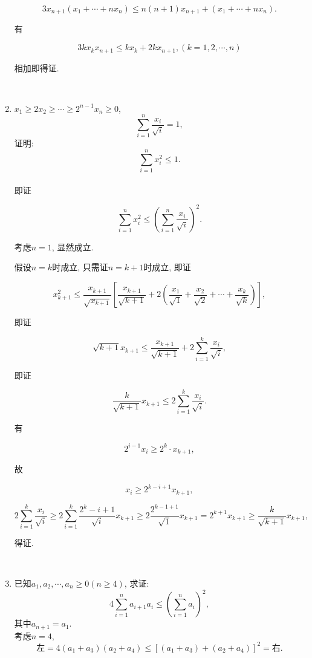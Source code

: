 \documentclass[8pt]{article}
\begin{document}
\begin{enumerate}
			$$3x_{n+1} (x_1 + \cdots + nx_n) \leq n(n+1) x_{n+1} + (x_1 + \cdots + nx_n).$$

			有

			$$3kx_k x_{n+1} \leq kx_k + 2kx_{n+1}, (k=1, 2, \cdots, n)$$

			相加即得证.

		~\\

		\item $x_1 \geq 2x_2 \geq \cdots \geq 2^{n-1} x_n \geq 0$, $$\sum_{i=1}^{n} \frac{x_i}{\sqrt{i}}=1,$$ 证明: $$\sum_{i=1}^{n} x_i^2 \leq 1.$$
			~\\

			即证

			$$\sum_{i=1}^{n} x_i^2 \leq \left(\sum_{i=1}^{n} \frac{x_i}{\sqrt{i}}\right)^2.$$

			考虑$n=1$, 显然成立.

			假设$n=k$时成立, 只需证$n=k+1$时成立, 即证

			$$x_{k+1}^2 \leq \frac{x_{k+1}}{\sqrt{x_{k+1}}} \left[\frac{x_{k+1}}{\sqrt{k+1}} + 2\left(\frac{x_1}{\sqrt{1}} + \frac{x_2}{\sqrt{2}} + \cdots + \frac{x_k}{\sqrt{k}}\right)\right],$$
 
			即证

			$$\sqrt{k+1} x_{k+1} \leq \frac{x_{k+1}}{\sqrt{k+1}} + 2\sum_{i=1}^{k} \frac{x_i}{\sqrt{i}},$$

			即证

			$$\frac{k}{\sqrt{k+1}} x_{k+1} \leq 2\sum_{i=1}^{k} \frac{x_i}{\sqrt{i}}.$$

			有

			$$2^{i-1} x_i \geq 2^k \cdot x_{k+1},$$

			故

			$$x_i \geq 2^{k-i+1} x_{k+1},$$

			$$2\sum_{i=1}^{k} \frac{x_i}{\sqrt{i}} \geq 2\sum_{i=1}^{k} \frac{2^k - i + 1}{\sqrt{i}} x_{k+1} \geq 2\frac{2^{k-1+1}}{\sqrt{1}} x_{k+1} = 2^{k+1} x_{k+1} \geq \frac{k}{\sqrt{k+1}} x_{k+1},$$

			得证.

		~\\

		\item 已知$a_1, a_2, \cdots, a_n \geq 0 (n\geq 4)$, 求证: $$4\sum_{i=1}^{n} a_{i+1} a_i \leq \left(\sum_{i=1}^{n} a_i\right)^2, $$ 其中$a_{n+1} = a_1$.
			~\\

			考虑$n=4$, $$\text{左} = 4(a_1 + a_3) (a_2 + a_4) \leq [(a_1 + a_3) + (a_2 + a_4)]^2 = \text{右}.$$


\end{enumerate}
\end{document}
